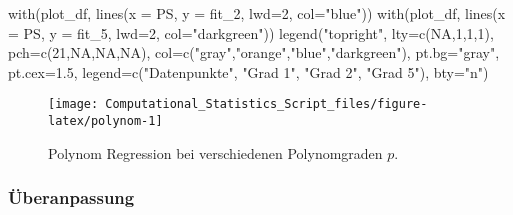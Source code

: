 \documentclass[
  ngerman,
]{book}
\newenvironment{Shaded}{\begin{snugshade}}{\end{snugshade}}
\newcommand{\AttributeTok}[1]{\textcolor[rgb]{0.77,0.63,0.00}{#1}}
\newcommand{\ConstantTok}[1]{\textcolor[rgb]{0.00,0.00,0.00}{#1}}
\newcommand{\DecValTok}[1]{\textcolor[rgb]{0.00,0.00,0.81}{#1}}
\newcommand{\FloatTok}[1]{\textcolor[rgb]{0.00,0.00,0.81}{#1}}
\newcommand{\FunctionTok}[1]{\textcolor[rgb]{0.00,0.00,0.00}{#1}}
\newcommand{\NormalTok}[1]{#1}
\newcommand{\StringTok}[1]{\textcolor[rgb]{0.31,0.60,0.02}{#1}}
\begin{document}
\begin{Shaded}
\begin{Highlighting}[]
\FunctionTok{with}\NormalTok{(plot\_df, }\FunctionTok{lines}\NormalTok{(}\AttributeTok{x =}\NormalTok{ PS, }\AttributeTok{y =}\NormalTok{ fit\_2, }\AttributeTok{lwd=}\DecValTok{2}\NormalTok{, }\AttributeTok{col=}\StringTok{"blue"}\NormalTok{))}
\FunctionTok{with}\NormalTok{(plot\_df, }\FunctionTok{lines}\NormalTok{(}\AttributeTok{x =}\NormalTok{ PS, }\AttributeTok{y =}\NormalTok{ fit\_5, }\AttributeTok{lwd=}\DecValTok{2}\NormalTok{, }\AttributeTok{col=}\StringTok{"darkgreen"}\NormalTok{))}
\FunctionTok{legend}\NormalTok{(}\StringTok{"topright"}\NormalTok{, }\AttributeTok{lty=}\FunctionTok{c}\NormalTok{(}\ConstantTok{NA}\NormalTok{,}\DecValTok{1}\NormalTok{,}\DecValTok{1}\NormalTok{,}\DecValTok{1}\NormalTok{), }\AttributeTok{pch=}\FunctionTok{c}\NormalTok{(}\DecValTok{21}\NormalTok{,}\ConstantTok{NA}\NormalTok{,}\ConstantTok{NA}\NormalTok{,}\ConstantTok{NA}\NormalTok{), }
       \AttributeTok{col=}\FunctionTok{c}\NormalTok{(}\StringTok{"gray"}\NormalTok{,}\StringTok{"orange"}\NormalTok{,}\StringTok{"blue"}\NormalTok{,}\StringTok{"darkgreen"}\NormalTok{), }\AttributeTok{pt.bg=}\StringTok{"gray"}\NormalTok{, }\AttributeTok{pt.cex=}\FloatTok{1.5}\NormalTok{,}
       \AttributeTok{legend=}\FunctionTok{c}\NormalTok{(}\StringTok{"Datenpunkte"}\NormalTok{, }\StringTok{"Grad 1"}\NormalTok{, }\StringTok{"Grad 2"}\NormalTok{, }\StringTok{"Grad 5"}\NormalTok{), }\AttributeTok{bty=}\StringTok{"n"}\NormalTok{)}
\end{Highlighting}
\end{Shaded}

\begin{figure}[h]

{\centering \texttt{[image: Computational\_Statistics\_Script\_files/figure-latex/polynom-1]} 

}

\caption{Polynom Regression bei verschiedenen Polynomgraden $p$.}\label{fig:polynom}
\end{figure}

\hypertarget{uxfcberanpassung}{%
\subsubsection*{Überanpassung}\label{uxfcberanpassung}}
\end{document}
